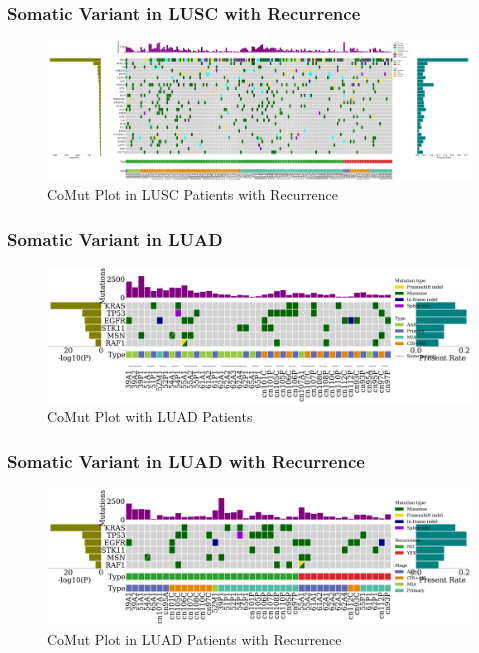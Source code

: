 \documentclass{beamer}
\begin{document}
    \begin{frame}
        \frametitle{Somatic Variant in LUSC with Recurrence}

        \begin{figure}
            \includegraphics[width=\linewidth]{figures/Mutect2/BWA-SQC.Recur.pdf}
            \caption{CoMut Plot in LUSC Patients with Recurrence}
        \end{figure}
    \end{frame}

    \begin{frame}
        \frametitle{Somatic Variant in LUAD}

        \begin{figure}
            \includegraphics[width=\linewidth]{figures/Mutect2/BWA-ADC.pdf}
            \caption{CoMut Plot with LUAD Patients}
        \end{figure}
    \end{frame}

    \begin{frame}
        \frametitle{Somatic Variant in LUAD with Recurrence}

        \begin{figure}
            \includegraphics[width=\linewidth]{figures/Mutect2/BWA-ADC.Recur.pdf}
            \caption{CoMut Plot in LUAD Patients with Recurrence}
        \end{figure}
    \end{frame}
\end{document}
